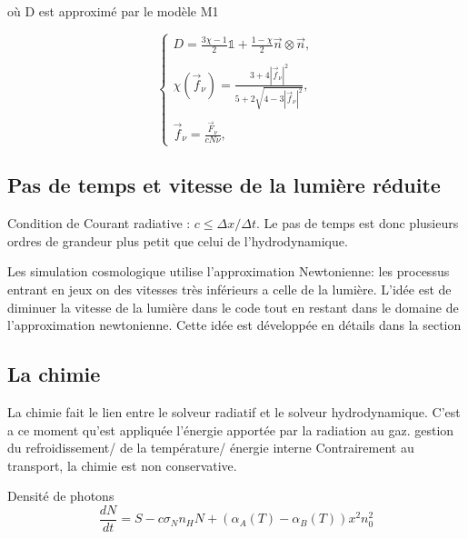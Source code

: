 où D est approximé par le modèle M1 \citep{levermore_relating_1984}%

\begin{equation}
\begin{cases}

D = \frac{ 3\chi -1 }{2} \mathbb{1} + \frac{ 1 - \chi }{2} \vec{n} \otimes \vec{n} , \\
\\
\chi(\vec{f}_\nu) = \frac{ 3+4 |\vec{f}_\nu|^2 }{5+2\sqrt{4-3|\vec{f}_\nu|^2}} , \\
\\
\vec{f}_\nu = \frac{ \vec{F}_\nu }{c N\nu }  ,

\end{cases}
\label{eq:tenseur}
\end{equation}


\subsection{Pas de temps et vitesse de la lumière réduite}

Condition de Courant radiative : $ c \leq \Delta x / \Delta t $.
Le pas de temps est donc plusieurs ordres de grandeur plus petit que celui de l'hydrodynamique.


Les simulation cosmologique utilise l'approximation Newtonienne: les processus entrant en jeux on des vitesses très inférieurs a celle de la lumière.
L'idée est de diminuer la vitesse de la lumière dans le code tout en restant dans le domaine de l'approximation newtonienne.
Cette idée est développée en détails dans la section %



\subsection{La chimie}

La chimie fait le lien entre le solveur radiatif et le solveur hydrodynamique.
C'est a ce moment qu'est appliquée l'énergie apportée par la radiation au gaz.
gestion du refroidissement/ de la température/ énergie interne
Contrairement au transport, la chimie est non conservative.

Densité de photons
\begin{equation}
\frac{dN}{dt} = S - c \sigma_N n_H N + \left( \alpha_A(T)  - \alpha_B(T) \right) x^2n_0^2
\end{equation}

